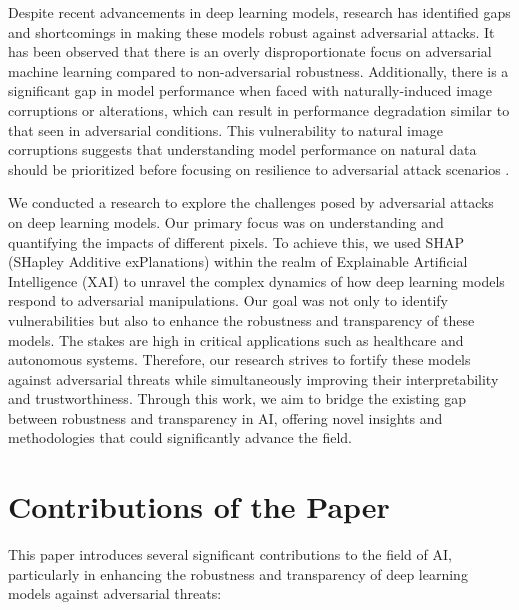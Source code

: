 \documentclass[10pt, conference, a4paper, final]{IEEEtran}
\begin{document}
Despite recent advancements in deep learning models, research has identified gaps and shortcomings in making these models robust against adversarial attacks. It has been observed that there is an overly disproportionate focus on adversarial machine learning compared to non-adversarial robustness. Additionally, there is a significant gap in model performance when faced with naturally-induced image corruptions or alterations, which can result in performance degradation similar to that seen in adversarial conditions. This vulnerability to natural image corruptions suggests that understanding model performance on natural data should be prioritized before focusing on resilience to adversarial attack scenarios \cite {Numair, Tianhang, Wei}. 

We conducted a research to explore the challenges posed by adversarial attacks on deep learning models. Our primary focus was on understanding and quantifying the impacts of different pixels. To achieve this, we used SHAP (SHapley Additive exPlanations) within the realm of Explainable Artificial Intelligence (XAI) to unravel the complex dynamics of how deep learning models respond to adversarial manipulations. Our goal was not only to identify vulnerabilities but also to enhance the robustness and transparency of these models. The stakes are high in critical applications such as healthcare and autonomous systems. Therefore, our research strives to fortify these models against adversarial threats while simultaneously improving their interpretability and trustworthiness. Through this work, we aim to bridge the existing gap between robustness and transparency in AI, offering novel insights and methodologies that could significantly advance the field.

\section{Contributions of the Paper}

This paper introduces several significant contributions to the field of AI, particularly in enhancing the robustness and transparency of deep learning models against adversarial threats:
\end{document}
